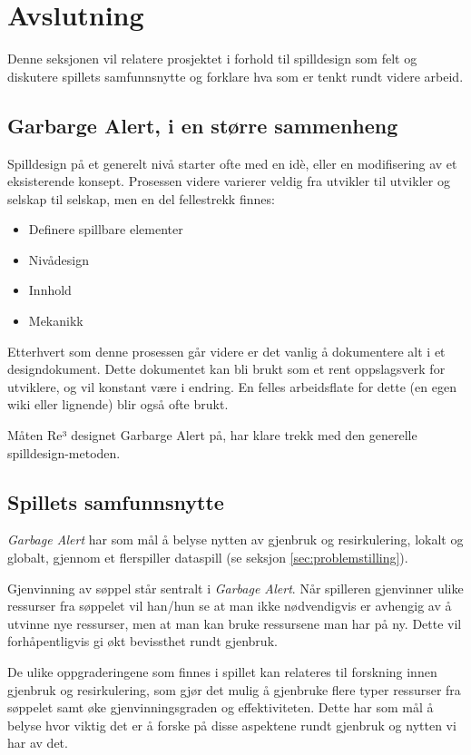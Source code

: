 \section{Avslutning}\label{sec:conclusion}
Denne seksjonen vil relatere prosjektet i forhold til spilldesign som
felt og diskutere spillets samfunnsnytte og forklare hva som er tenkt
rundt videre arbeid.

\subsection{Garbarge Alert, i en større sammenheng}
Spilldesign på et generelt nivå starter ofte med en idè, eller en
modifisering av et eksisterende konsept. Prosessen videre varierer
veldig fra utvikler til utvikler og selskap til selskap, men en del
fellestrekk finnes:
\begin{itemize}
\item Definere spillbare elementer
\item Nivådesign
\item Innhold
\item Mekanikk
\end{itemize}
Etterhvert som denne prosessen går videre er det vanlig å dokumentere
alt i et designdokument. Dette dokumentet kan bli brukt som et rent
oppslagsverk for utviklere, og vil konstant være i endring. En felles
arbeidsflate for dette (en egen wiki eller lignende) blir også ofte brukt.

Måten Re³ designet Garbarge Alert på, har klare trekk med den generelle
spilldesign-metoden.


\subsection{Spillets samfunnsnytte}
\emph{Garbage Alert} har som mål å belyse nytten av gjenbruk og resirkulering, lokalt og globalt, gjennom et flerspiller dataspill (se seksjon \ref{sec:problemstilling}).

Gjenvinning av søppel står sentralt i \emph{Garbage Alert}. Når spilleren gjenvinner ulike ressurser fra søppelet vil han/hun se at man ikke nødvendigvis er avhengig av å utvinne nye ressurser, men at man kan bruke ressursene man har på ny. Dette vil forhåpentligvis gi økt bevissthet rundt gjenbruk.

De ulike oppgraderingene som finnes i spillet kan relateres til forskning innen gjenbruk og resirkulering, som gjør det mulig å gjenbruke flere typer ressurser fra søppelet samt øke gjenvinningsgraden og effektiviteten. Dette har som mål å belyse hvor viktig det er å forske på disse aspektene rundt gjenbruk og nytten vi har av det.

